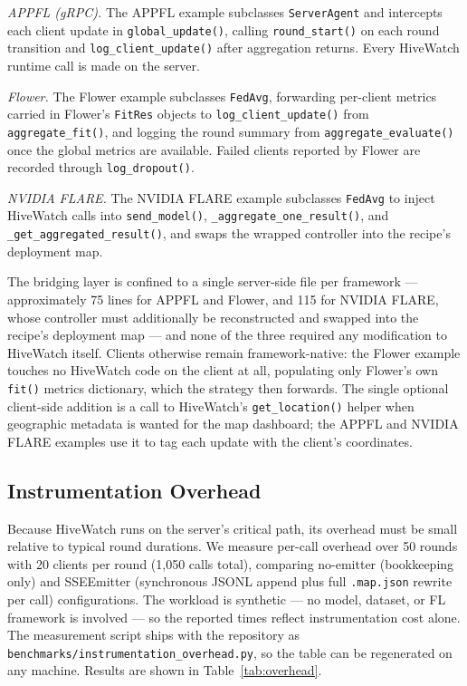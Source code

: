\documentclass[preprint,12pt, a4paper]{elsarticle}
\begin{document}
\textit{APPFL (gRPC).} The APPFL example subclasses \texttt{ServerAgent} and intercepts each client update in \texttt{global\_update()}, calling \texttt{round\_start()} on each round transition and \texttt{log\_client\_update()} after aggregation returns. Every HiveWatch runtime call is made on the server.

\textit{Flower.} The Flower example subclasses \texttt{FedAvg}, forwarding per-client metrics carried in Flower's \texttt{FitRes} objects to \texttt{log\_client\_update()} from \texttt{aggregate\_fit()}, and logging the round summary from \texttt{aggregate\_evaluate()} once the global metrics are available. Failed clients reported by Flower are recorded through \texttt{log\_dropout()}.

\textit{NVIDIA FLARE.} The NVIDIA FLARE example subclasses \texttt{FedAvg} to inject HiveWatch calls into \texttt{send\_model()}, \texttt{\_aggregate\_one\_result()}, and \texttt{\_get\_aggregated\_result()}, and swaps the wrapped controller into the recipe's deployment map.

The bridging layer is confined to a single server-side file per framework --- approximately 75 lines for APPFL and Flower, and 115 for NVIDIA FLARE, whose controller must additionally be reconstructed and swapped into the recipe's deployment map --- and none of the three required any modification to HiveWatch itself. Clients otherwise remain framework-native: the Flower example touches no HiveWatch code on the client at all, populating only Flower's own \texttt{fit()} metrics dictionary, which the strategy then forwards. The single optional client-side addition is a call to HiveWatch's \texttt{get\_location()} helper when geographic metadata is wanted for the map dashboard; the APPFL and NVIDIA FLARE examples use it to tag each update with the client's coordinates.

\subsection{Instrumentation Overhead}

Because HiveWatch runs on the server's critical path, its overhead must be small relative to typical round durations. We measure per-call overhead over 50 rounds with 20 clients per round (1{,}050 calls total), comparing no-emitter (bookkeeping only) and SSEEmitter (synchronous JSONL append plus full \texttt{.map.json} rewrite per call) configurations. The workload is synthetic --- no model, dataset, or FL framework is involved --- so the reported times reflect instrumentation cost alone. The measurement script ships with the repository as \texttt{benchmarks/instrumentation\_overhead.py}, so the table can be regenerated on any machine. Results are shown in Table~\ref{tab:overhead}.
\end{document}
